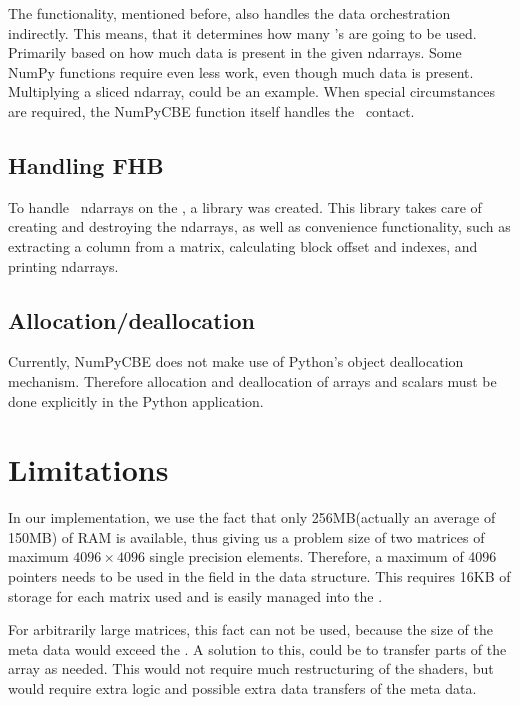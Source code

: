 The functionality, mentioned before, also handles the data
orchestration indirectly. This means, that it determines how many
\SPE{}'s are going to be used. Primarily based on how much data is
present in the given ndarrays. Some NumPy functions require even less
work, even though much data is present. Multiplying a sliced ndarray,
could be an example. When special circumstances are required, the
NumPyCBE function itself handles the \SPE\ contact.




\subsection{Handling FHB}

To handle \FHB\ ndarrays on the \PPE{}, a library was created. This
library takes care of creating and destroying the ndarrays, as well as
convenience functionality, such as extracting a column from a matrix,
calculating block offset and indexes, and printing ndarrays.

\subsection{Allocation/deallocation}
Currently, NumPyCBE does not make use of Python's object deallocation mechanism.
Therefore allocation and deallocation of arrays and scalars must be done explicitly
in the Python application.

\section{Limitations}

In our implementation, we use the fact that only 256MB(actually an
average of 150MB) of RAM is available, thus giving us a problem size
of two matrices of maximum $4096 \times 4096$ single precision
elements. Therefore, a maximum of 4096 pointers needs to be used in
the field  in the data structure. This requires
16KB of storage for each matrix used and is easily managed into the
\LS{}.

For arbitrarily large matrices, this fact can not be used, because the
size of the meta data would exceed the \LS{}. A solution to this,
could be to transfer parts of the  array as
needed. This would not require much restructuring of the shaders, but
would require extra logic and possible extra data transfers of the
meta data.
